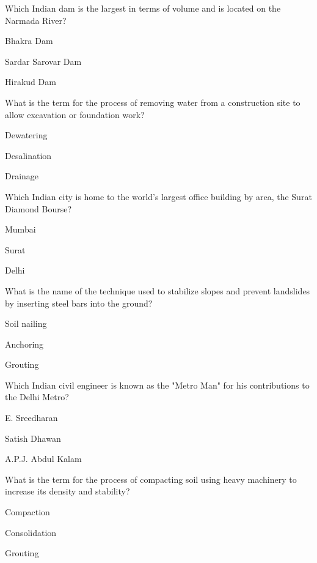 \begin{enhancedmcq}{Which Indian dam is the largest in terms of volume and is located on the Narmada River?}
\item Bhakra Dam
\item Sardar Sarovar Dam
\item Hirakud Dam

\end{enhancedmcq}
\begin{enhancedmcq}{What is the term for the process of removing water from a construction site to allow excavation or foundation work?}
\item Dewatering
\item Desalination
\item Drainage

\end{enhancedmcq}
\begin{enhancedmcq}{Which Indian city is home to the world's largest office building by area, the Surat Diamond Bourse?}
\item Mumbai
\item Surat
\item Delhi

\end{enhancedmcq}
\begin{enhancedmcq}{What is the name of the technique used to stabilize slopes and prevent landslides by inserting steel bars into the ground?}
\item Soil nailing
\item Anchoring
\item Grouting

\end{enhancedmcq}
\begin{enhancedmcq}{Which Indian civil engineer is known as the "Metro Man" for his contributions to the Delhi Metro?}
\item E. Sreedharan
\item Satish Dhawan
\item A.P.J. Abdul Kalam

\end{enhancedmcq}
\begin{enhancedmcq}{What is the term for the process of compacting soil using heavy machinery to increase its density and stability?}
\item Compaction
\item Consolidation
\item Grouting

\end{enhancedmcq}
